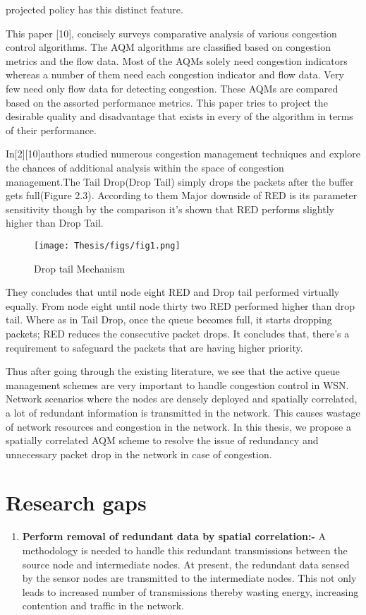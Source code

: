 projected policy has this distinct feature.
\par
This paper [10], concisely surveys comparative analysis
of various congestion control algorithms. The AQM
algorithms are classified based on congestion metrics and
the flow data. Most of the AQMs solely need congestion
indicators whereas a number of them need each congestion
indicator and flow data. Very few need only flow data for
detecting congestion. These AQMs are compared based on
the assorted performance metrics. This paper tries to
project the desirable quality and disadvantage that exists in
every of the algorithm in terms of their performance.
\par 
In[2][10]authors studied numerous congestion management techniques and explore
the chances of additional analysis within the space of congestion management.The Tail Drop(Drop Tail) simply drops the packets after the buffer gets full(Figure 2.3). According to them Major
downside of RED is its parameter sensitivity though by the comparison it's shown that RED performs slightly higher than Drop Tail. 
\begin{figure}[h!]
    \centering
    \texttt{[image: Thesis/figs/fig1.png]}
    \caption{Drop tail Mechanism}
    \label{fig:my_label}
\end{figure}
They concludes that until node eight RED and Drop tail performed virtually equally. From node eight until node thirty two RED performed higher than drop tail. Where as in Tail Drop, once the queue becomes full, it starts dropping packets; RED reduces the consecutive packet drops. It concludes that, there's a requirement to safeguard the packets that are having higher priority. 
\par
Thus after going through the existing literature, we see that the active queue management schemes are very important to handle congestion control in WSN. Network scenarios where the nodes are densely deployed and spatially correlated, a lot of redundant information is transmitted in the network. This causes wastage of network resources and congestion in the network. In this thesis, we propose a spatially correlated AQM scheme to resolve the issue of redundancy and unnecessary packet drop in the network in case of congestion.
\section{Research gaps}
\begin{enumerate}
    \item \textbf{Perform removal of redundant data by spatial correlation:-} A methodology is needed to handle this redundant transmissions between the source node and intermediate nodes. At present, the redundant data sensed by the sensor nodes are transmitted to the intermediate nodes. This not only leads to increased number of transmissions thereby wasting energy, increasing contention and traffic in the network.
    \end{enumerate}
